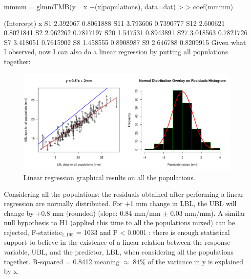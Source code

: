 \documentclass{article}
\begin{document}
mmmm = glmmTMB(y ~ x +(x|populations), data=dat)
> 
> coef(mmmm)

    (Intercept)         x
S1     2.392067 0.8061888
S11    3.793606 0.7390777
S12    2.600621 0.8021841
S2     2.962262 0.7817197
S20    1.547531 0.8943891
S27    3.018563 0.7821726
S7     3.418051 0.7615902
S8     1.458555 0.8908987
S9     2.646788 0.8209915
\fi
Given what I observed, now I can also do a linear regression by putting all populations together:

\begin{figure}[H]
\centering
  \includegraphics[scale=0.6]{full_reg.pdf}
\caption{Linear regression graphical results on all the populations.}
  \label{fig:fullregS1}
\end{figure}

Considering all the populations: the residuals obtained after performing a linear regression are normally distributed. For +1 mm change in LBL, the UBL will change by +0.8 mm (rounded) (slope: 0.84 mm/mm $\pm$ 0.03 mm/mm). A similar null hypothesis to H1 (applied this time to all the populations mixed) can be rejected, F-statistic$_{1, 195}$ = 1033 and  P < 0.0001 : there is enough statistical support to believe in the existence of a linear relation between the response variable, UBL, and the predictor, LBL, when considering all the populations together. R-squared = 0.8412 meaning $\approx$ 84\% of the variance in y is explained by x.\\ 
\AtNextBibliography{\footnotesize}
\printbibliography
\end{document}
